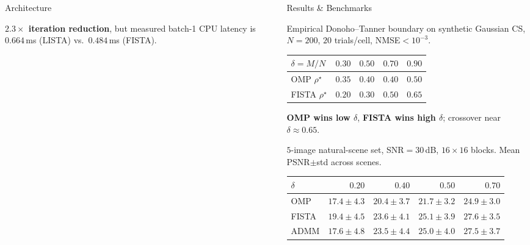 \documentclass[final]{beamer}
\newlength{\sepwidth}
\newlength{\colwidth}
\newcommand{\separatorcolumn}{
  \begin{column}{\sepwidth}
\end{column}}
\begin{document}
\begin{frame}[t]
\begin{columns}[t]
\begin{column}{\colwidth}
\begin{block}{Architecture}
        \raggedright
        \textbf{$2.3\times$ iteration reduction}, but measured batch-1
        CPU latency is $0.664$\,ms (LISTA) vs.\ $0.484$\,ms (FISTA).

      \end{block}

    \end{column}

    \separatorcolumn

    \begin{column}{\colwidth}

      \begin{block}{Results \& Benchmarks}

        Empirical Donoho--Tanner boundary on synthetic Gaussian CS,
        $N{=}200$, $20$ trials/cell, NMSE${<}10^{-3}$.

        \medskip
        \centering\small
        \renewcommand{\arraystretch}{1.15}
        \begin{tabular}{@{}l r r r r@{}}
          \toprule
          \textbf{$\delta=M/N$} & $0.30$ & $0.50$ & $0.70$ & $0.90$ \\
          \midrule
          OMP $\rho^\star$   & $\mathbf{0.35}$ & $\mathbf{0.40}$ & $0.40$         & $0.50$ \\
          FISTA $\rho^\star$ & $0.20$ & $0.30$ & $\mathbf{0.50}$ & $\mathbf{0.65}$ \\
          \bottomrule
        \end{tabular}

        \raggedright
        \textbf{OMP wins low $\delta$}, \textbf{FISTA wins high
        $\delta$}; crossover near $\delta{\approx}0.65$.

        $5$-image natural-scene set, SNR${=}30$\,dB, $16{\times}16$
        blocks. Mean PSNR$\pm$std across scenes.

        \medskip
        \centering\small
        \renewcommand{\arraystretch}{1.15}
        \begin{tabular}{@{}l r r r r@{}}
          \toprule
          $\delta$ & $0.20$ & $0.40$ & $0.50$ & $0.70$ \\
          \midrule
          OMP   & $17.4{\pm}4.3$ & $20.4{\pm}3.7$ & $21.7{\pm}3.2$ & $24.9{\pm}3.0$ \\
          FISTA & $\mathbf{19.4{\pm}4.5}$ & $\mathbf{23.6{\pm}4.1}$ & $\mathbf{25.1{\pm}3.9}$ & $\mathbf{27.6{\pm}3.5}$ \\
          ADMM  & $17.6{\pm}4.8$ & $23.5{\pm}4.4$ & $25.0{\pm}4.0$ & $27.5{\pm}3.7$ \\
          \bottomrule
        \end{tabular}


\end{block}
\end{column}
\end{columns}
\end{frame}
\end{document}
